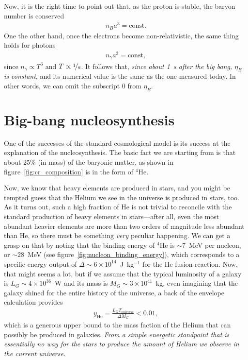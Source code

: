 Now, it is the right time to point out that, as the proton is stable, the baryon
number is conserved
\begin{align*}
  n_B a^3 = \text{const}.
\end{align*}
One the other hand, once the electrons become non-relativistic, the same thing holds
for photons
\begin{align*}
  n_\gamma a^3 = \text{const},
\end{align*}
since $n_\gamma \propto T^3$ and $T \propto \nicefrac{1}{a}$. It follows that,
\emph{since about 1~s after the big bang, $\eta_B$ is constant}, and its numerical
value is the same as the one measured today. In other words, we can omit the
subscript $0$ from $\eta_B$.



\section{Big-bang nucleosynthesis}

One of the successes of the standard cosmological model is its success at the
explanation of the nucleosynthesis. The basic fact we are starting from is that
about 25\% (in mass) of the baryonic matter, as shown in figure~\ref{fig:cr_composition}
is in the form of $^4$He.

Now, we know that heavy elements are produced in stars, and you might be tempted
guess that the Helium we see in the universe is produced in stars, too. As it
turns out, such a high fraction of He is not trivial to reconcile with the standard
production of heavy elements in stars---after all, even the most abundant heavier
elements are more than two orders of magnitude less abundant than He, so there must
be something \emph{very} peculiar happening. We can get a grasp on that by noting
that the binding energy of $^4$He is $\sim 7$~MeV per nucleon, or $\sim 28$~MeV
(see figure~\ref{fig:nucleon_binding_energy}), which corresponds to a specific energy
output of $\Delta \sim 6 \times 10^{14}$~J~kg$^{-1}$ for the He fusion reaction.
Now, that might seems a lot, but if we assume that the typical luminosity of a
galaxy is $L_G \sim  4 \times 10^{36}$~W and its mass is $M_G \sim 3 \times 10^{41}$~kg,
even imagining that the galaxy shined for the entire history of the universe, a
back of the envelope calculation provides
\begin{align*}
  y_\text{He} = \frac{L_G T_\text{universe}}{\Delta M_G} < 0.01,
\end{align*}
which is a generous upper bound to the mass faction of the Helium that can possibly
be produced in galaxies. \emph{From a simple energetic standpoint that is essentially
no way for the stars to produce the amount of Helium we observe in the current
universe.}

